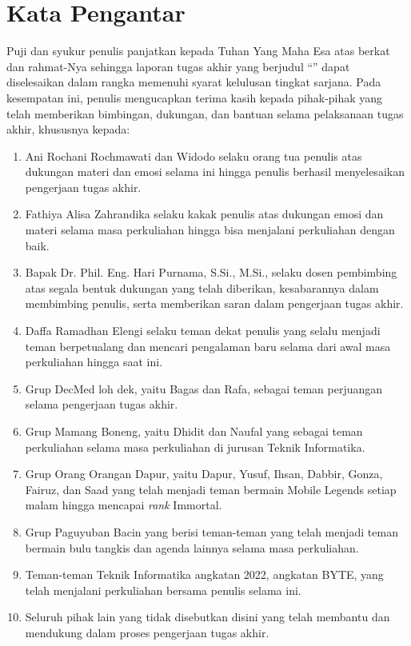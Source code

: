 \chapter*{Kata Pengantar}

Puji dan syukur penulis panjatkan kepada Tuhan Yang Maha Esa atas berkat dan rahmat-Nya sehingga laporan tugas akhir yang berjudul ``\thetitle'' dapat diselesaikan dalam rangka memenuhi syarat kelulusan tingkat sarjana. Pada kesempatan ini, penulis mengucapkan terima kasih kepada pihak-pihak yang telah memberikan bimbingan, dukungan, dan bantuan selama pelaksanaan tugas akhir, khususnya kepada:

\begin{enumerate}
	\item Ani Rochani Rochmawati dan Widodo selaku orang tua penulis atas dukungan materi dan emosi selama ini hingga penulis berhasil menyelesaikan pengerjaan tugas akhir.
	\item Fathiya Alisa Zahrandika selaku kakak penulis atas dukungan emosi dan materi selama masa perkuliahan hingga bisa menjalani perkuliahan dengan baik.
	\item Bapak Dr. Phil. Eng. Hari Purnama, S.Si., M.Si., selaku dosen pembimbing atas segala bentuk dukungan yang telah diberikan, kesabarannya dalam membimbing penulis, serta memberikan saran dalam pengerjaan tugas akhir.
	\item Daffa Ramadhan Elengi selaku teman dekat penulis yang selalu menjadi teman berpetualang dan mencari pengalaman baru selama dari awal masa perkuliahan hingga saat ini.
	\item Grup DecMed loh dek, yaitu Bagas dan Rafa, sebagai teman perjuangan selama pengerjaan tugas akhir.
	\item Grup Mamang Boneng, yaitu Dhidit dan Naufal yang sebagai teman perkuliahan selama masa perkuliahan di jurusan Teknik Informatika.
	\item Grup Orang Orangan Dapur, yaitu Dapur, Yusuf, Ihsan, Dabbir, Gonza, Fairuz, dan Saad yang telah menjadi teman bermain Mobile Legends setiap malam hingga mencapai \textit{rank} Immortal.
	\item Grup Paguyuban Bacin yang berisi teman-teman yang telah menjadi teman bermain bulu tangkis dan agenda lainnya selama masa perkuliahan.
	\item Teman-teman Teknik Informatika angkatan 2022, angkatan BYTE, yang telah menjalani perkuliahan bersama penulis selama ini.
	\item Seluruh pihak lain yang tidak disebutkan disini yang telah membantu dan mendukung dalam proses pengerjaan tugas akhir.
\end{enumerate}

